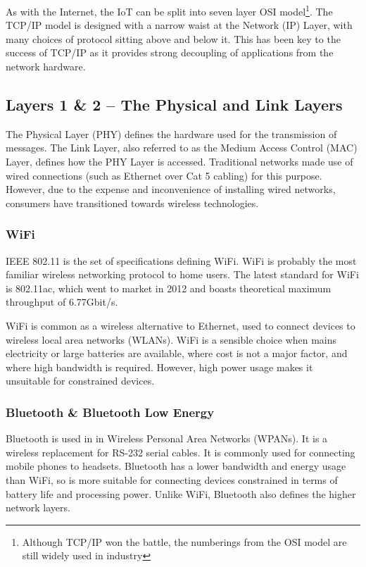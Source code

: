 \documentclass[10pt,journal,compsoc]{IEEEtran}
\begin{document}
As with the Internet, the IoT can be split into seven layer OSI
model\footnote{Although TCP/IP won the battle, the numberings from the OSI
model are still widely used in industry}. The TCP/IP model is designed with a
narrow waist at the Network (IP) Layer, with many choices of protocol sitting
above and below it. This has been key to the success of TCP/IP as it
provides strong decoupling of applications from the network hardware.

\subsection{Layers 1 \& 2 -- The Physical and Link Layers}
\label{layer_1_2}
The Physical Layer (PHY) defines the hardware used for the transmission of
messages. The Link Layer, also referred to as the Medium Access Control (MAC)
Layer, defines how the PHY Layer is accessed. Traditional networks made use of
wired connections (such as Ethernet over Cat 5 cabling) for this purpose.
However, due to the expense and inconvenience of installing wired networks,
consumers have transitioned towards wireless technologies. 

\subsubsection{WiFi}
IEEE 802.11 is the set of specifications defining WiFi. WiFi is probably the
most familiar wireless networking protocol to home users. The latest standard
for WiFi is 802.11ac, which went to market in 2012 and boasts theoretical
maximum throughput of 6.77Gbit/s. 

WiFi is common as a wireless alternative to Ethernet, used to connect devices
to wireless local area networks (WLANs). WiFi is a sensible choice when mains
electricity or large batteries are available, where cost is not a major
factor, and where high bandwidth is required. However, high power usage makes
it unsuitable for constrained devices.

\subsubsection{Bluetooth \& Bluetooth Low Energy}
Bluetooth is used in in Wireless Personal Area Networks (WPANs). It is a
wireless replacement for RS-232 serial cables. It is commonly used for
connecting mobile phones to headsets. Bluetooth has a lower bandwidth and
energy usage than WiFi, so is more suitable for connecting devices constrained
in terms of battery life and processing power. Unlike WiFi, Bluetooth also
defines the higher network layers. 
\end{document}
